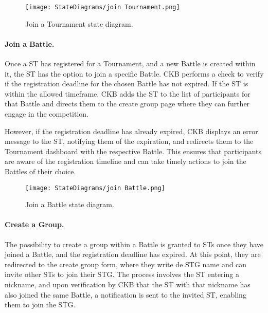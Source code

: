 \begin{figure}[H]
    \begin{center}
        \texttt{[image: StateDiagrams/join Tournament.png]}
        \caption{Join a Tournament state diagram.}
        \label{fig:join_Tournament_sd}%
    \end{center}
\end{figure}

\paragraph{Join a Battle.}
Once a ST has registered for a Tournament, and a new Battle is created within it, the ST has the option to join a specific Battle. CKB performs a check to verify if the registration deadline for the chosen Battle has not expired. If the ST is within the allowed timeframe, CKB adds the ST to the list of participants for that Battle and directs them to the create group page where they can further engage in the competition.

However, if the registration deadline has already expired, CKB displays an error message to the ST, notifying them of the expiration, and redirects them to the Tournament dashboard with the respective Battle. This ensures that participants are aware of the registration timeline and can take timely actions to join the Battles of their choice.

\begin{figure}[H]
    \begin{center}
        \texttt{[image: StateDiagrams/join Battle.png]}
        \caption{Join a Battle state diagram.}
        \label{fig:join_Battle_sd}%
    \end{center}
\end{figure}

\paragraph{Create a Group.}
The possibility to create a group within a Battle is granted to STs once they have joined a Battle, and the registration deadline has expired. At this point, they are redirected to the create group form, where they write de STG name and can invite other STs to join their STG. The process involves the ST entering a nickname, and upon verification by CKB that the ST with that nickname has also joined the same Battle, a notification is sent to the invited ST, enabling them to join the STG.

